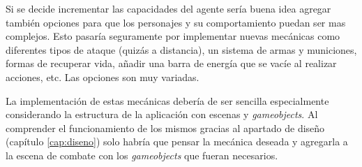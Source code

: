 Si se decide incrementar las capacidades del agente sería buena idea agregar también opciones para que los personajes y su comportamiento puedan ser mas complejos. Esto pasaría seguramente por implementar nuevas mecánicas como diferentes tipos de ataque (quizás a distancia), un sistema de armas y municiones, formas de recuperar vida, añadir una barra de energía que se vacíe al realizar acciones, etc. Las opciones son muy variadas.

\bigskip

La implementación de estas mecánicas debería de ser sencilla especialmente considerando la estructura de la aplicación con escenas y \textit{gameobjects}. Al comprender el funcionamiento de los mismos gracias al apartado de diseño (capítulo \ref{cap:diseno}) solo habría que pensar la mecánica deseada y agregarla a la escena de combate con los \textit{gameobjects} que fueran necesarios.